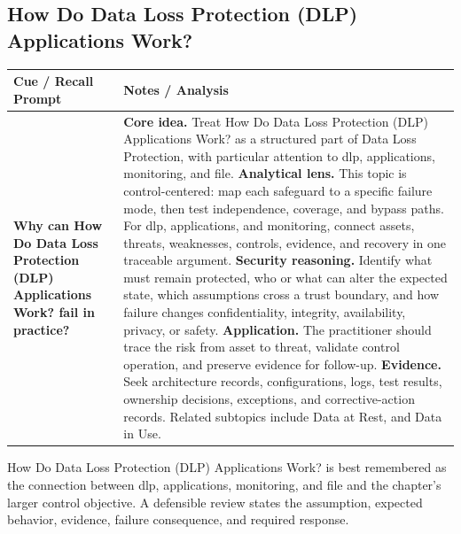 \documentclass[11pt]{article}
\newcommand{\CornellHeader}{%
\rowcolor{Navy}\color{white}\bfseries Cue / Recall Prompt & \color{white}\bfseries Notes / Analysis\\\hline}
\newcommand{\CornellRow}[2]{%
\cellcolor{CueGray}\RaggedRight\textbf{#1} & \RaggedRight #2\\\hline}
\begin{document}
\subsection*{How Do Data Loss Protection (DLP) Applications Work?}
\begin{longtable}{>{\RaggedRight\arraybackslash}p{}|>{\RaggedRight\arraybackslash}p{}}
\CornellHeader
\CornellRow{Why can How Do Data Loss Protection (DLP) Applications Work? fail in practice?}{\textbf{Core idea.} Treat How Do Data Loss Protection (DLP) Applications Work? as a structured part of Data Loss Protection, with particular attention to dlp, applications, monitoring, and file. \textbf{Analytical lens.} This topic is control-centered: map each safeguard to a specific failure mode, then test independence, coverage, and bypass paths. For dlp, applications, and monitoring, connect assets, threats, weaknesses, controls, evidence, and recovery in one traceable argument. \textbf{Security reasoning.} Identify what must remain protected, who or what can alter the expected state, which assumptions cross a trust boundary, and how failure changes confidentiality, integrity, availability, privacy, or safety. \textbf{Application.} The practitioner should trace the risk from asset to threat, validate control operation, and preserve evidence for follow-up. \textbf{Evidence.} Seek architecture records, configurations, logs, test results, ownership decisions, exceptions, and corrective-action records. Related subtopics include Data at Rest, and Data in Use.}
\end{longtable}
\begin{topicsummary}
How Do Data Loss Protection (DLP) Applications Work? is best remembered as the connection between dlp, applications, monitoring, and file and the chapter's larger control objective. A defensible review states the assumption, expected behavior, evidence, failure consequence, and required response.
\end{topicsummary}
\end{document}
